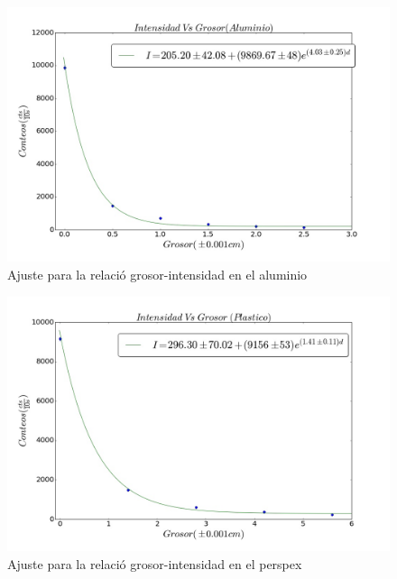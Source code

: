 \documentclass[%
 reprint,
 amsmath,amssymb,
 aps,
]{revtex4-1}
\begin{document}
\begin{figure}[h!]
\centering
\includegraphics[width=1.1\linewidth]{aluminio.jpg}
\caption{Ajuste para la relació grosor-intensidad en el aluminio}
\label{fig:aluminio}
\end{figure}

\begin{figure}[h!]
\centering
\includegraphics[width=1.1\linewidth]{perspex.jpg}
\caption{Ajuste para la relació grosor-intensidad en el perspex}
\label{fig:perspex}
\end{figure}
\end{document}
